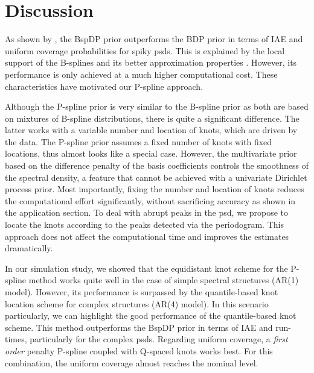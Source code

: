 \documentclass[twocolumn,final]{svjour3}
\begin{document}
\section{Discussion}

As shown by \cite{Edwards2019}, the BspDP prior outperforms the BDP prior in terms of IAE and uniform coverage probabilities for spiky psds.  This is explained by the local support of the B-splines and its better approximation properties \citep{Edwards2019}.  However, its performance is only achieved at a much higher computational cost.  These characteristics have motivated our P-spline approach.  

Although the P-spline prior is very similar to the B-spline prior as both are based on mixtures of B-spline distributions, there is quite a significant difference.  The latter works with a variable number and location of knots, which are driven by the data.  The P-spline prior assumes a fixed number of knots  with fixed locations, thus almost looks like a special case. However, the multivariate prior based on the difference penalty of the basis coefficients controls the smoothness of the spectral density, a feature that cannot be achieved with a univariate Dirichlet process prior. Most importantly, fixing the number and location of knots reduces the computational effort significantly, without sacrificing accuracy as shown in the application section.  To deal with abrupt peaks in the psd, we propose to locate the knots according to the peaks detected via the periodogram.  This approach does not affect the computational time and improves the estimates dramatically. %

In our simulation study, we showed that the equidistant knot scheme for the P-spline method works quite well in the case of simple spectral structures (AR(1) model).  However, its performance is surpassed by the quantile-based  knot location scheme for complex structures (AR(4) model).  In this scenario particularly, we can highlight the good performance of the quantile-based knot scheme. This method outperforms the BspDP prior in terms of IAE and run-times, particularly for the complex psds.    Regarding uniform coverage,  a {\em first order} penalty P-spline coupled with
Q-spaced knots works best. For this combination, the uniform coverage almost reaches the nominal level.

\end{document}
